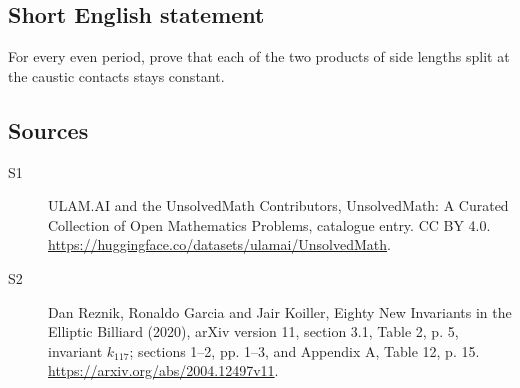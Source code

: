 \documentclass[11pt]{article}
\begin{document}
\subsection{Short English statement}
For every even period, prove that each of the two products of side lengths split at the caustic contacts stays constant.
\subsection{Sources}
\begin{description}
\item[\hypertarget{source:statement:1}{S1}] ULAM.AI and the UnsolvedMath Contributors, UnsolvedMath: A Curated Collection of Open Mathematics Problems, catalogue entry. CC BY 4.0. \url{https://huggingface.co/datasets/ulamai/UnsolvedMath}.
\item[\hypertarget{source:statement:2}{S2}] Dan Reznik, Ronaldo Garcia and Jair Koiller, Eighty New Invariants in the Elliptic Billiard (2020), arXiv version 11, section 3.1, Table 2, p. 5, invariant $k_{117}$; sections 1--2, pp. 1--3, and Appendix A, Table 12, p. 15. \url{https://arxiv.org/abs/2004.12497v11}.
\end{description}
\label{end:statement}
\end{document}
